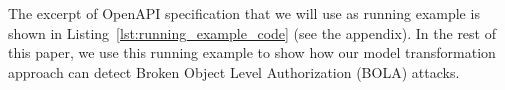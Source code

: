 %
%

The excerpt of OpenAPI specification that we will use as running example is shown in Listing~\ref{lst:running_example_code} (see the appendix). In the rest of this paper, we use this running example to show how our model transformation approach can detect Broken Object Level Authorization (BOLA) attacks.

